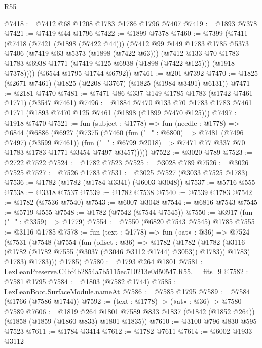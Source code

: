 \begin{lexlean}{R55}
\begin{coremodule}
@7418 := @7412 @68 @1208 @1783 @1786 @1796 @7407
@7419 := @1893 @7378
@7421 := @7419 @44 @1796
@7422 := @1899 @7378
@7460 := @7399
    (@7411
      (@7418
        (@7421 (@1898 (@7422 @44)))
        (@7412
          @99
          @149
          @1783
          @1785
          @5373
          @7406
          (@7419 @63 @5373 (@1898 (@7422 @63)))
          (@7412
            @133
            @70
            @1783
            @1783
            @6938
            @1771
            (@7419 @125 @6938 (@1898 (@7422 @125)))
            (@1918 @7378))))
      (@6544 @1795 @1744 @6792))
@7461 := @201 @7392
@7470 := @1825 (@2671 @7461) (@1825 (@2208 @3767) (@1825 (@1984 @3491) @6131))
@7471 := @2181 @7470
@7481 := @7471 @86 @337 @149 @1785 @1783 (@1742 @7461 @1771) (@3547 @7461)
@7496 := @1884
    @7470
    @133
    @70
    @1783
    @1783
    @7461
    @1771
    (@1893 @7470 @125 @7461 (@1898 (@1899 @7470 @125)))
@7497 := @1918 @7470
@7521 := fun (subject : @1778) =>
  fun (needle : @1778) =>
  @6844
    (@6886
      (@6927
        (@7375
          (@7460
            (fun ("_" : @6800) => @7481 (@7496 @7497) (@3599 @7461))
            (fun ("_" : @6799 @2018) => @7471 @77 @337 @70 @1783 @1783 @1771 @3454 @7497 @3457)))))
@7522 := @3020 @789
@7523 := @2722 @7522
@7524 := @1782 @7523
@7525 := @3028 @789
@7526 := @3026 @7525
@7527 := @7526 @1783
@7531 := @3025 @7527 (@3033 @7525 @1783)
@7536 := @1782 (@1782 (@1784 @3341) (@6003 @3048))
@7537 := @5716 @555
@7538 := @3318 @7537
@7539 := @1782 @7538
@7540 := @7539 @1783
@7542 := @1782 (@7536 @7540)
@7543 := @6007 @3048
@7544 := @6816 @7543
@7545 := @5719 @555
@7548 := @1782 (@7542 (@7544 @7545))
@7550 := @3917 (fun ("_" : @3359) => @1779)
@7554 := @7550 (@6820 @7543 @7545) @1785
@7555 := @3116 @1785
@7578 := fun (text : @1778) =>
  fun («at» : @36) =>
  @7524
    (@7531
      (@7548
        (@7554
          (fun (offset : @36) =>
          @1782
            (@1782
              (@1782 (@3116 (@1782 (@1782 @7555 (@3037 (@3046 @3112 @1744) @3053)) @1783)) @1783)
              @1783)
            @1783)))
      @1785)
@7580 := @1793 @264 @1801
@7581 := LexLeanPreserve.C4bf4b2854a7b5115ec710213e0d50547.R55.__fits_9
@7582 := @7581 @1795
@7584 := @1803 (@7582 @1744)
@7585 := LexLeanBoot.SurfaceModule.nameAt
@7586 := @7585 @1795
@7589 := @7584 (@1766 (@7586 @1744))
@7592 := (text : @1778) -> («at» : @36) -> @7580 @7589
@7606 := @1819
    @264
    @1801
    @7589
    @833
    @1837
    (@1842 (@1852 @264))
    (@1858 (@1859 (@1860 @833) @1801 @1835))
@7610 := @3100 @796 @830 @595 @7523
@7611 := @1784 @3414
@7612 := @1782 @7611
@7614 := @6002 @1933 @3112

\end{coremodule}
\end{lexlean}
